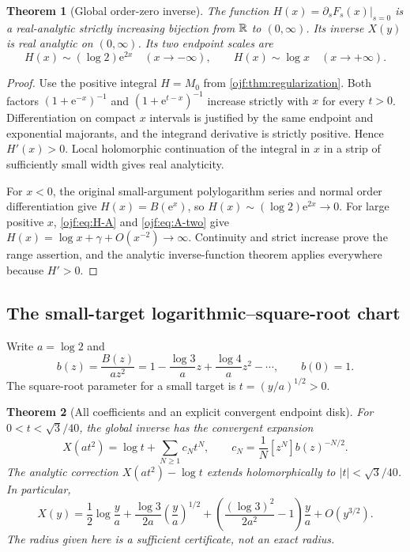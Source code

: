 \documentclass[11pt,a4paper]{article}
\numberwithin{equation}{section}
\newtheorem{theorem}{Theorem}[section]
\theoremstyle{definition}\newtheorem{definition}[theorem]{Definition}
\theoremstyle{remark}\newtheorem{remark}[theorem]{Remark}
\newcommand{\ee}{\mathrm e}\newcommand{\ii}{\mathrm i}\newcommand{\dd}{\,\mathrm d}
\newcommand{\coef}[2]{[#1^{#2}]}
\begin{document}
\begin{theorem}[Global order-zero inverse]\label{ojf:thm:global}
The function $H(x)=\partial_sF_s(x)|_{s=0}$ is a real-analytic strictly
increasing bijection from $\mathbb R$ to $(0,\infty)$. Its inverse $X(y)$ is
real analytic on $(0,\infty)$. Its two endpoint scales are
\begin{equation}\label{ojf:eq:H-endpoints}
 H(x)\sim(\log2)\ee^{2x}\quad(x\to-\infty),\qquad
 H(x)\sim\log x\quad(x\to+\infty).
\end{equation}
\end{theorem}
\begin{proof}
Use the positive integral $H=M_0$ from
\cref{ojf:thm:regularization}. Both factors
$(1+\ee^{-x})^{-1}$ and $(1+\ee^{t-x})^{-1}$ increase strictly with
$x$ for every $t>0$. Differentiation on compact $x$ intervals is
justified by the same endpoint and exponential majorants, and the
integrand derivative is strictly positive. Hence $H'(x)>0$.
Local holomorphic continuation of the integral in $x$ in a strip of
sufficiently small width gives real analyticity.

For $x<0$, the original small-argument polylogarithm series and normal
order differentiation give $H(x)=B(\ee^x)$, so
$H(x)\sim(\log2)\ee^{2x}\to0$. For large positive $x$,
\eqref{ojf:eq:H-A} and \eqref{ojf:eq:A-two} give
$H(x)=\log x+\gamma+O(x^{-2})\to\infty$.
Continuity and strict increase prove the range assertion, and the
analytic inverse-function theorem applies everywhere because $H'>0$.
\end{proof}

\subsection{The small-target logarithmic--square-root chart}
Write $a=\log2$ and
\begin{equation}\label{ojf:eq:small-b}
 b(z)=\frac{B(z)}{az^2}
       =1-\frac{\log3}{a}z+\frac{\log4}{a}z^2-\cdots,
 \qquad b(0)=1.
\end{equation}
The square-root parameter for a small target is
$t=(y/a)^{1/2}>0$.

\begin{theorem}[All coefficients and an explicit convergent endpoint disk]
\label{ojf:thm:small-inverse}
For $0<t<\sqrt3/40$, the global inverse has the convergent expansion
\begin{equation}\label{ojf:eq:small-inverse}
 X(at^2)=\log t+\sum_{N\ge1}c_Nt^N,
 \qquad c_N=\frac1N\coef{z}{N}b(z)^{-N/2}.
\end{equation}
The analytic correction $X(at^2)-\log t$ extends holomorphically to
$|t|<\sqrt3/40$. In particular,
\begin{equation}\label{ojf:eq:small-first}
 X(y)=\frac12\log\frac ya+
     \frac{\log3}{2a}\left(\frac ya\right)^{1/2}
     +\left(\frac{(\log3)^2}{2a^2}-1\right)\frac ya
     +O(y^{3/2}).
\end{equation}
The radius given here is a sufficient certificate, not an exact radius.
\end{theorem}
\end{document}
